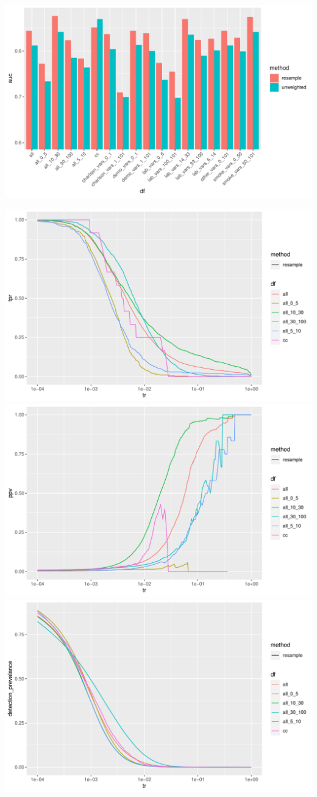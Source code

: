 \documentclass[12pt]{article}
\begin{document}
\begin{center}
\includegraphics[width=\textwidth]{2M_aucs.pdf}
\end{center}

\newpage
\begin{center}
\includegraphics[width=.7\textwidth]{2M_tpr_missing.pdf}
\includegraphics[width=.7\textwidth]{2M_ppv_missing.pdf}
\includegraphics[width=.7\textwidth]{2M_dp_missing.pdf}
\end{center}
\end{document}
